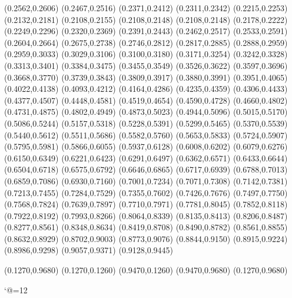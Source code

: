 \PST@Diamond(0.2562,0.2606)
\PST@Diamond(0.2467,0.2516)
\PST@Diamond(0.2371,0.2412)
\PST@Diamond(0.2311,0.2342)
\PST@Diamond(0.2215,0.2253)
\PST@Diamond(0.2132,0.2181)
\PST@Diamond(0.2108,0.2155)
\PST@Dashed(0.2108,0.2148)
(0.2108,0.2148)
(0.2178,0.2222)
(0.2249,0.2296)
(0.2320,0.2369)
(0.2391,0.2443)
(0.2462,0.2517)
(0.2533,0.2591)
(0.2604,0.2664)
(0.2675,0.2738)
(0.2746,0.2812)
(0.2817,0.2885)
(0.2888,0.2959)
(0.2959,0.3033)
(0.3029,0.3106)
(0.3100,0.3180)
(0.3171,0.3254)
(0.3242,0.3328)
(0.3313,0.3401)
(0.3384,0.3475)
(0.3455,0.3549)
(0.3526,0.3622)
(0.3597,0.3696)
(0.3668,0.3770)
(0.3739,0.3843)
(0.3809,0.3917)
(0.3880,0.3991)
(0.3951,0.4065)
(0.4022,0.4138)
(0.4093,0.4212)
(0.4164,0.4286)
(0.4235,0.4359)
(0.4306,0.4433)
(0.4377,0.4507)
(0.4448,0.4581)
(0.4519,0.4654)
(0.4590,0.4728)
(0.4660,0.4802)
(0.4731,0.4875)
(0.4802,0.4949)
(0.4873,0.5023)
(0.4944,0.5096)
(0.5015,0.5170)
(0.5086,0.5244)
(0.5157,0.5318)
(0.5228,0.5391)
(0.5299,0.5465)
(0.5370,0.5539)
(0.5440,0.5612)
(0.5511,0.5686)
(0.5582,0.5760)
(0.5653,0.5833)
(0.5724,0.5907)
(0.5795,0.5981)
(0.5866,0.6055)
(0.5937,0.6128)
(0.6008,0.6202)
(0.6079,0.6276)
(0.6150,0.6349)
(0.6221,0.6423)
(0.6291,0.6497)
(0.6362,0.6571)
(0.6433,0.6644)
(0.6504,0.6718)
(0.6575,0.6792)
(0.6646,0.6865)
(0.6717,0.6939)
(0.6788,0.7013)
(0.6859,0.7086)
(0.6930,0.7160)
(0.7001,0.7234)
(0.7071,0.7308)
(0.7142,0.7381)
(0.7213,0.7455)
(0.7284,0.7529)
(0.7355,0.7602)
(0.7426,0.7676)
(0.7497,0.7750)
(0.7568,0.7824)
(0.7639,0.7897)
(0.7710,0.7971)
(0.7781,0.8045)
(0.7852,0.8118)
(0.7922,0.8192)
(0.7993,0.8266)
(0.8064,0.8339)
(0.8135,0.8413)
(0.8206,0.8487)
(0.8277,0.8561)
(0.8348,0.8634)
(0.8419,0.8708)
(0.8490,0.8782)
(0.8561,0.8855)
(0.8632,0.8929)
(0.8702,0.9003)
(0.8773,0.9076)
(0.8844,0.9150)
(0.8915,0.9224)
(0.8986,0.9298)
(0.9057,0.9371)
(0.9128,0.9445)

\PST@Border(0.1270,0.9680)
(0.1270,0.1260)
(0.9470,0.1260)
(0.9470,0.9680)
(0.1270,0.9680)

\catcode`@=12
\fi
\endpspicture

